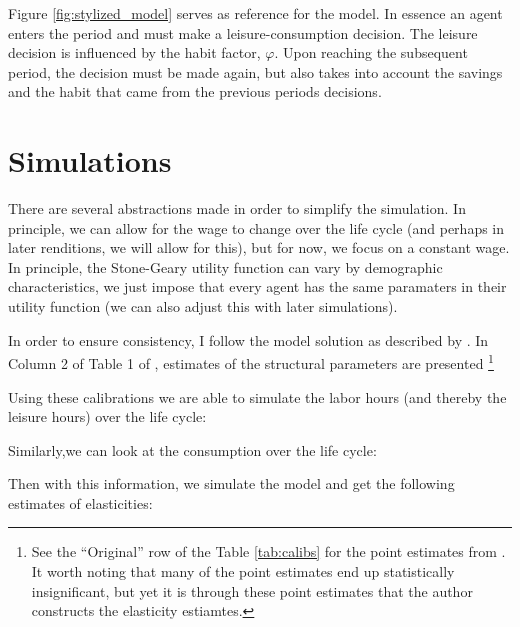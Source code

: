 \documentclass[ProjectMMD]{subfiles}
\begin{document}
\providecommand{\figName}{stylized_model} %
\providecommand{\figFile}{\figName} %
\hypertarget{\figFile}{}
Figure \ref{fig:stylized_model} serves as reference for the model. In essence an agent enters the period and must make a leisure-consumption decision. The leisure decision is influenced by the habit factor, $\varphi$. Upon reaching the subsequent period, the decision must be made again, but also takes into account the savings and the habit that came from the previous periods decisions.


\hypertarget{Simulations}{}
\section{Simulations}
There are several abstractions made in order to simplify the simulation. In principle, we can allow for the wage to change over the life cycle (and perhaps in later renditions, we will allow for this), but for now, we focus on a constant wage. In principle, the Stone-Geary utility function can vary by demographic characteristics, we just impose that every agent has the same paramaters in their utility function (we can also adjust this with later simulations).   

In order to ensure consistency, I follow the model solution as described by \cite{bover1991relaxing}. In Column 2 of Table 1 of \cite{bover1991relaxing}, estimates of the structural parameters are presented \footnote{See the ``Original'' row of the Table \ref{tab:calibs} for the point estimates from \cite{bover1991relaxing}. It worth noting that many of the point estimates end up statistically insignificant, but yet it is through these point estimates that the author constructs the elasticity estiamtes. }

Using these calibrations we are able to simulate the labor hours (and thereby the leisure hours) over the life cycle:
\renewcommand{\figName}{hours_lc}
\renewcommand{\figFile}{\figName}
\hypertarget{\figFile}{}



Similarly,we can look at the consumption over the life cycle:

\renewcommand{\figName}{consumption_lc}
\renewcommand{\figFile}{\figName}
\hypertarget{\figFile}{}



Then with this information, we simulate the model and get the following estimates of elasticities:

\end{document}
